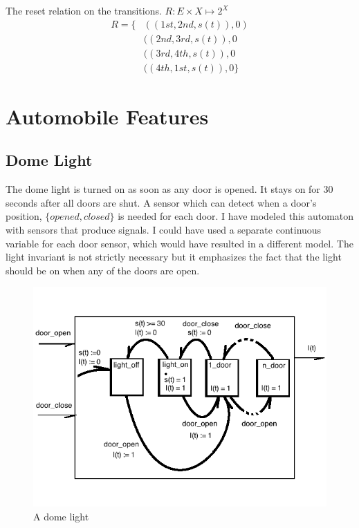 \documentclass{article}
\begin{document}
The reset relation on the transitions.
$R: E \times X \mapsto 2^X$
\begin{align}
R = \{ & (( 1st, 2nd , s(t)),  0 ) \\
    & (( 2nd, 3rd , s(t)), 0 \\
    & (( 3rd, 4th , s(t)), 0  \\
    & (( 4th, 1st , s(t)), 0  \}
\end{align}

\section{Automobile Features}

\subsection{Dome Light}
The dome light is turned on as soon as any door
is opened.
It stays on for 30 seconds after all doors are shut.
A sensor which can detect when a door's position,
$\{opened, closed\}$ is needed for each door.
I have modeled this automaton with sensors that
produce signals.
I could have used a separate continuous variable
for each door sensor, which would have resulted
in a different model.
The light invariant is not strictly necessary but
it emphasizes the fact that the light should be on
when any of the doors are open.

\begin{figure}[h!]
\centering
\includegraphics[scale=0.7]{hw7_4a_actor_dome.png}
\caption{A dome light}
\label{fig:dome_light}
\end{figure}
\end{document}
